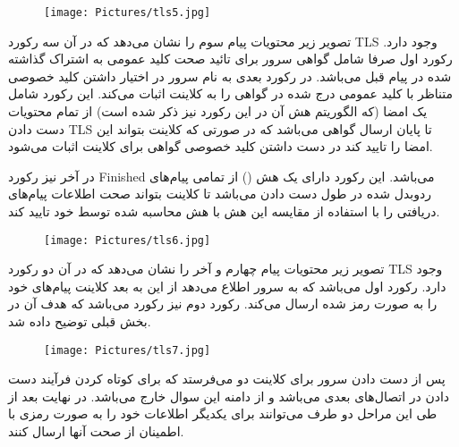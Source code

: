 \documentclass{report}
\begin{document}
\begin{figure}[H]
    \centering
    \texttt{[image: Pictures/tls5.jpg]}
    \label{tls5}
\end{figure}

تصویر زیر محتویات پیام سوم را نشان می‌دهد که در آن سه رکورد TLS وجود دارد. رکورد اول صرفا شامل گواهی سرور برای تائید صحت کلید عمومی به اشتراک گذاشته شده در  پیام قبل می‌باشد. در رکورد بعدی به نام  سرور در اختیار داشتن کلید خصوصی متناظر با کلید عمومی درج شده در گواهی را به کلاینت اثبات می‌کند. این رکورد شامل یک امضا (که الگوریتم هش آن در این رکورد نیز ذکر شده است) از تمام محتویات دست دادن TLS تا پایان ارسال گواهی می‌باشد که در صورتی که کلاینت بتواند این امضا را تایید کند در دست داشتن کلید خصوصی گواهی برای کلاینت اثبات می‌شود.

در آخر نیز رکورد Finished می‌باشد. این رکورد دارای یک هش () از تمامی پیام‌های ردوبدل شده در طول دست دادن می‌باشد تا کلاینت بتواند صحت اطلاعات پیام‌های دریافتی را با استفاده از مقایسه این هش با هش محاسبه شده توسط خود تایید کند.
\begin{figure}[H]
    \centering
    \texttt{[image: Pictures/tls6.jpg]}
    \label{tls6}
\end{figure}

تصویر زیر محتویات پیام چهارم و آخر را نشان می‌دهد که در آن دو رکورد TLS وجود دارد. رکورد اول  می‌باشد که به سرور اطلاع می‌دهد از این به بعد کلاینت پیام‌های خود را به صورت رمز شده ارسال می‌کند. رکورد دوم نیز رکورد  می‌باشد که هدف آن در بخش قبلی توضیح داده شد.
\begin{figure}[H]
    \centering
    \texttt{[image: Pictures/tls7.jpg]}
    \label{tls7}
\end{figure}

پس از دست دادن سرور برای کلاینت دو  می‌فرستد که برای کوتاه کردن فرآیند دست دادن در اتصال‌های بعدی می‌باشد و از دامنه این سوال خارج می‌باشد. در نهایت بعد از طی این مراحل دو طرف می‌توانند برای یکدیگر اطلاعات خود را به صورت رمزی با اطمینان از صحت آنها ارسال کنند.
\end{document}
